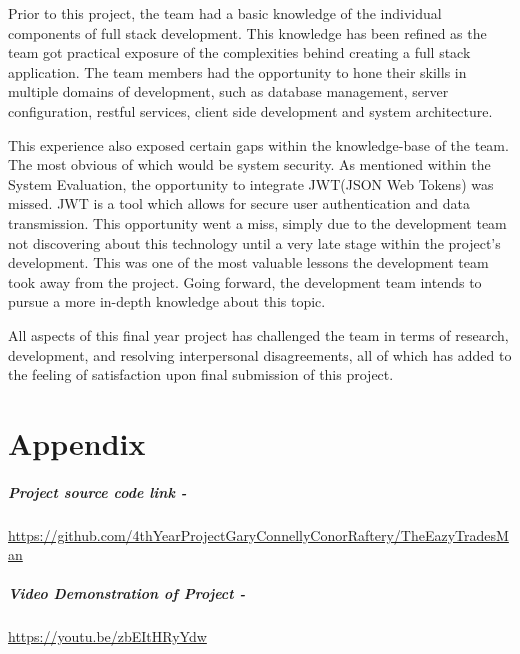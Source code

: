 \bigskip

Prior to this project, the team had a basic knowledge of the individual components of full stack development. This knowledge has been refined as the team got practical exposure of the complexities behind creating a full stack application. The team members had the opportunity to hone their skills in multiple domains of development, such as database management, server configuration, restful services, client side development and system architecture.

\bigskip

This experience also exposed certain gaps within the knowledge-base of the team. The most obvious of which would be system security. As mentioned within the System Evaluation, the opportunity to integrate JWT(JSON Web Tokens) was missed. JWT is a tool which allows for secure user authentication and data transmission. This opportunity went a miss, simply due to the development team not discovering about this technology until a very late stage within the project's development. This was one of the most valuable lessons the development team took away from the project. Going forward, the development team intends to pursue a more in-depth knowledge about this topic.

\bigskip

All aspects of this final year project has challenged the team in terms of research, development, and resolving interpersonal disagreements, all of which has added to the feeling of satisfaction upon final submission of this project.


\chapter{Appendix}

\paragraph{Project source code link - \newline}
\bigskip

\href{https://github.com/4thYearProjectGaryConnellyConorRaftery/TheEazyTradesMan}{https://github.com/4thYearProjectGaryConnellyConorRaftery/TheEazyTradesMan}

\bigskip

\paragraph{Video Demonstration of Project - \newline}

\bigskip

\href{https://youtu.be/zbEItHRyYdw}{https://youtu.be/zbEItHRyYdw}

%


